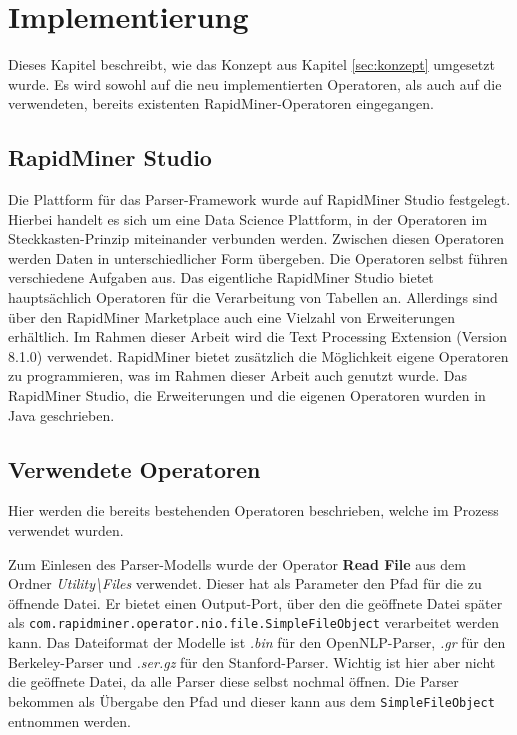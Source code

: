 %
\chapter{Implementierung}
\label{sec:impl}
Dieses Kapitel beschreibt, wie das Konzept aus Kapitel \ref{sec:konzept} umgesetzt wurde. Es wird sowohl auf die neu implementierten Operatoren, als auch auf die verwendeten, bereits existenten RapidMiner-Operatoren eingegangen. 

\section{RapidMiner Studio}
\label{sec:impl:rms}

Die Plattform für das Parser-Framework wurde auf RapidMiner Studio \cite{rmstudio} festgelegt. Hierbei handelt es sich um eine Data Science Plattform, in der Operatoren im Steckkasten-Prinzip miteinander verbunden werden. Zwischen diesen Operatoren werden Daten in unterschiedlicher Form übergeben. Die Operatoren selbst führen verschiedene Aufgaben aus. Das eigentliche RapidMiner Studio bietet hauptsächlich Operatoren für die Verarbeitung von Tabellen an. Allerdings sind über den RapidMiner Marketplace auch eine Vielzahl von Erweiterungen erhältlich. Im Rahmen dieser Arbeit wird die Text Processing Extension (Version 8.1.0) \cite{textExt} %
verwendet. RapidMiner bietet zusätzlich die Möglichkeit eigene Operatoren zu programmieren, was im Rahmen dieser Arbeit auch genutzt wurde. Das RapidMiner Studio, die Erweiterungen und die eigenen Operatoren wurden in Java geschrieben. \\

\section{Verwendete Operatoren}

Hier werden die bereits bestehenden Operatoren beschrieben, welche im Prozess verwendet wurden.

Zum Einlesen des Parser-Modells wurde der Operator \textbf{Read File} aus dem Ordner \textit{Utility\textbackslash Files} verwendet. Dieser hat als Parameter den Pfad für die zu öffnende Datei. Er bietet einen Output-Port, über den die geöffnete Datei später als \texttt{com.rapidminer.operator.nio.file.SimpleFileObject} verarbeitet werden kann. Das Dateiformat der Modelle ist \textit{.bin} für den OpenNLP-Parser, \textit{.gr} für den Berkeley-Parser und \textit{.ser.gz} für den Stanford-Parser. Wichtig ist hier aber nicht die geöffnete Datei, da alle Parser diese selbst nochmal öffnen. Die Parser bekommen als Übergabe den Pfad und dieser kann aus dem \texttt{SimpleFileObject} entnommen werden.

